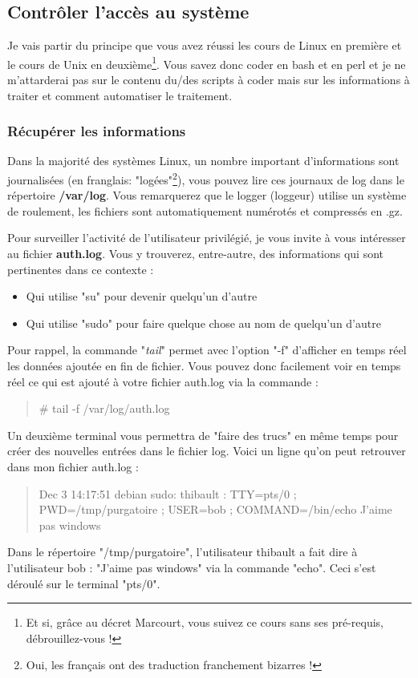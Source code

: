 \documentclass[a4paper,11pt]{article}
\newcommand{\commande}[1] {
    \begin{quote}
    \tt\raggedright #1 
    \end{quote}
}
\begin{document}
\subsection{Contrôler l'accès au système}
\par Je vais partir du principe que vous avez réussi les cours de Linux en première et le cours de Unix en deuxième\footnote{Et si, grâce au décret Marcourt, vous suivez ce cours sans ses pré-requis, débrouillez-vous !}. Vous savez donc coder en bash et en perl et je ne m'attarderai pas sur le contenu du/des scripts à coder mais sur les informations à traiter et comment automatiser le traitement.

\subsubsection{Récupérer les informations}
\par Dans la majorité des systèmes Linux, un nombre important d'informations sont journalisées (en franglais: "logées"\footnote{Oui, les français ont des traduction franchement bizarres !}), vous pouvez lire ces journaux de log dans le répertoire \textbf{/var/log}. Vous remarquerez que le logger (loggeur) utilise un système de roulement, les fichiers sont automatiquement numérotés et compressés en .gz.
\par Pour surveiller l'activité de l'utilisateur privilégié, je vous invite à vous intéresser au fichier \textbf{auth.log}. Vous y trouverez, entre-autre, des informations qui sont pertinentes dans ce contexte :
\begin{itemize}
    \item Qui utilise "su" pour devenir quelqu'un d'autre
    \item Qui utilise "sudo" pour faire quelque chose au nom de quelqu'un d'autre
\end{itemize}
\par Pour rappel, la commande "\emph{tail}" permet avec l'option "-f" d'afficher en temps réel les données ajoutée en fin de fichier. Vous pouvez donc facilement voir en temps réel ce qui est ajouté à votre fichier auth.log via la commande :
\commande{\# tail -f /var/log/auth.log}
\par Un deuxième terminal vous permettra de "faire des trucs" en même temps pour créer des nouvelles entrées dans le fichier log. Voici un ligne qu'on peut retrouver dans mon fichier auth.log :
\commande{Dec 3 14:17:51 debian sudo:  thibault : TTY=pts/0 ; PWD=/tmp/purgatoire ; USER=bob ; COMMAND=/bin/echo J'aime pas windows}
\par Dans le répertoire "/tmp/purgatoire", l'utilisateur thibault a fait dire à l'utilisateur bob : "J'aime pas windows" via la commande "echo". Ceci s'est déroulé sur le terminal "pts/0".
\end{document}
